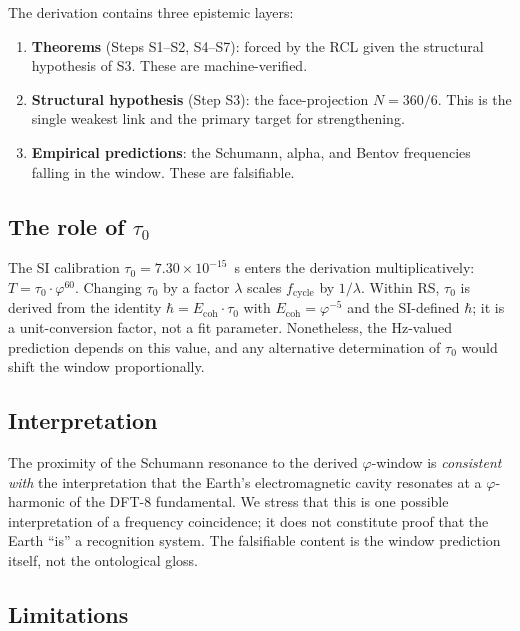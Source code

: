 \documentclass[11pt,a4paper]{article}
\begin{document}
The derivation contains three epistemic layers:
\begin{enumerate}
  \item \textbf{Theorems} (Steps S1--S2, S4--S7): forced by the RCL
    given the structural hypothesis of S3. These are machine-verified.
  \item \textbf{Structural hypothesis} (Step S3): the face-projection
    $N=360/6$. This is the single weakest link and the primary target
    for strengthening.
  \item \textbf{Empirical predictions}: the Schumann, alpha, and
    Bentov frequencies falling in the window. These are falsifiable.
\end{enumerate}

\subsection{The role of $\tau_0$}

The SI calibration $\tau_0 = 7.30 \times 10^{-15}$~s enters the
derivation multiplicatively: $T = \tau_0 \cdot \varphi^{60}$.
Changing $\tau_0$ by a factor $\lambda$ scales
$f_{\mathrm{cycle}}$ by $1/\lambda$. Within RS, $\tau_0$ is derived
from the identity $\hbar = E_{\mathrm{coh}} \cdot \tau_0$ with
$E_{\mathrm{coh}} = \varphi^{-5}$ and the SI-defined $\hbar$; it is
a unit-conversion factor, not a fit parameter. Nonetheless, the
Hz-valued prediction depends on this value, and any alternative
determination of $\tau_0$ would shift the window proportionally.

\subsection{Interpretation}

The proximity of the Schumann resonance to the derived
$\varphi$-window is \emph{consistent with} the interpretation that
the Earth's electromagnetic cavity resonates at a $\varphi$-harmonic
of the DFT-8 fundamental. We stress that this is one possible
interpretation of a frequency coincidence; it does not constitute
proof that the Earth ``is'' a recognition system. The falsifiable
content is the window prediction itself, not the ontological gloss.

\subsection{Limitations}
\end{document}
